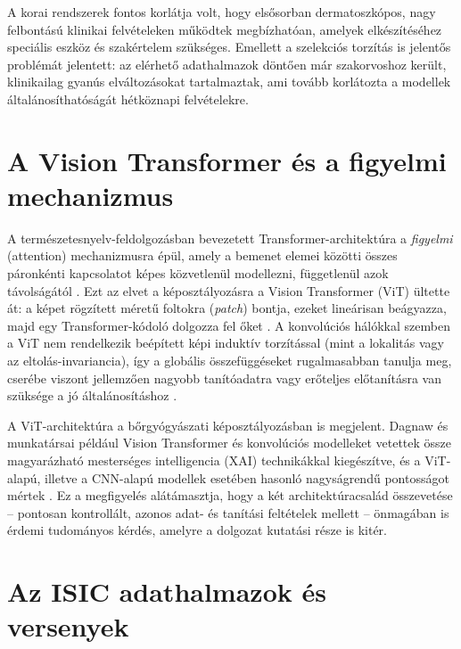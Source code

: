 A korai rendszerek fontos korlátja volt, hogy elsősorban dermatoszkópos, nagy
felbontású klinikai felvételeken működtek megbízhatóan, amelyek elkészítéséhez
speciális eszköz és szakértelem szükséges. Emellett a szelekciós torzítás is
jelentős problémát jelentett: az elérhető adathalmazok döntően már szakorvoshoz
került, klinikailag gyanús elváltozásokat tartalmaztak, ami tovább korlátozta a
modellek általánosíthatóságát hétköznapi felvételekre.

\section{A Vision Transformer és a figyelmi mechanizmus}

A természetesnyelv-feldolgozásban bevezetett Transformer-architektúra a
\textit{figyelmi} (attention) mechanizmusra épül, amely a bemenet elemei közötti
összes páronkénti kapcsolatot képes közvetlenül modellezni, függetlenül azok
távolságától \cite{vaswani2017attention}. Ezt az elvet a képosztályozásra a
Vision Transformer (ViT) ültette át: a képet rögzített méretű foltokra
(\textit{patch}) bontja, ezeket lineárisan beágyazza, majd egy Transformer-kódoló
dolgozza fel őket \cite{dosovitskiy2021vit}. A konvolúciós hálókkal szemben a ViT
nem rendelkezik beépített képi induktív torzítással (mint a lokalitás vagy az
eltolás-invariancia), így a globális összefüggéseket rugalmasabban tanulja meg,
cserébe viszont jellemzően nagyobb tanítóadatra vagy erőteljes előtanításra van
szüksége a jó általánosításhoz \cite{dosovitskiy2021vit}.

A ViT-architektúra a bőrgyógyászati képosztályozásban is megjelent. Dagnaw és
munkatársai például Vision Transformer és konvolúciós modelleket vetettek össze
magyarázható mesterséges intelligencia (XAI) technikákkal kiegészítve, és a
ViT-alapú, illetve a CNN-alapú modellek esetében hasonló nagyságrendű pontosságot
mértek \cite{dagnaw2024vit}. Ez a megfigyelés alátámasztja, hogy a két
architektúracsalád összevetése -- pontosan kontrollált, azonos adat- és
tanítási feltételek mellett -- önmagában is érdemi tudományos kérdés, amelyre a
dolgozat kutatási része is kitér.

\section{Az ISIC adathalmazok és versenyek}

